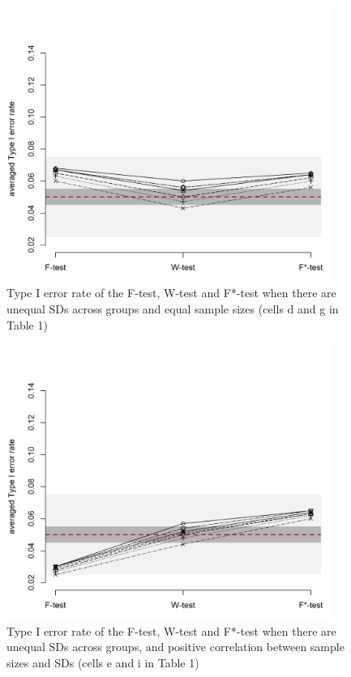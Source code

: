 \documentclass[man,floatsintext]{apa6}
\begin{document}
\begin{figure}
\includegraphics[width=400px]{Rmarkdown folder/Rmarkdown inputs/Fig1C} \caption{Type I error rate of the F-test, W-test and F*-test when there are unequal SDs across groups and equal sample sizes (cells d and g in Table 1)}\label{fig:unnamed-chunk-4}
\end{figure}

\begin{figure}
\includegraphics[width=400px]{Rmarkdown folder/Rmarkdown inputs/Fig1D} \caption{Type I error rate of the F-test, W-test and F*-test when there are unequal SDs across groups, and positive correlation between sample sizes and SDs (cells e and i in Table 1)}\label{fig:unnamed-chunk-5}
\end{figure}
\end{document}
